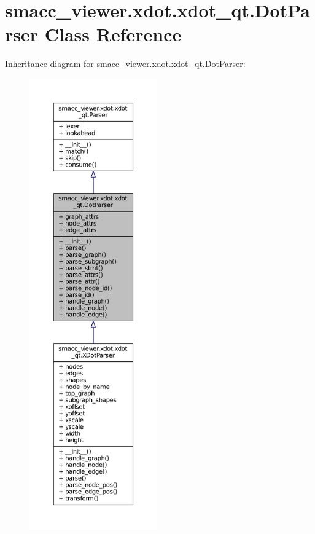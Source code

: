 \hypertarget{classsmacc__viewer_1_1xdot_1_1xdot__qt_1_1DotParser}{}\section{smacc\+\_\+viewer.\+xdot.\+xdot\+\_\+qt.\+Dot\+Parser Class Reference}
\label{classsmacc__viewer_1_1xdot_1_1xdot__qt_1_1DotParser}


Inheritance diagram for smacc\+\_\+viewer.\+xdot.\+xdot\+\_\+qt.\+Dot\+Parser\+:
\nopagebreak
\begin{figure}[H]
\begin{center}
\leavevmode
\includegraphics[height=550pt]{classsmacc__viewer_1_1xdot_1_1xdot__qt_1_1DotParser__inherit__graph}
\end{center}
\end{figure}


